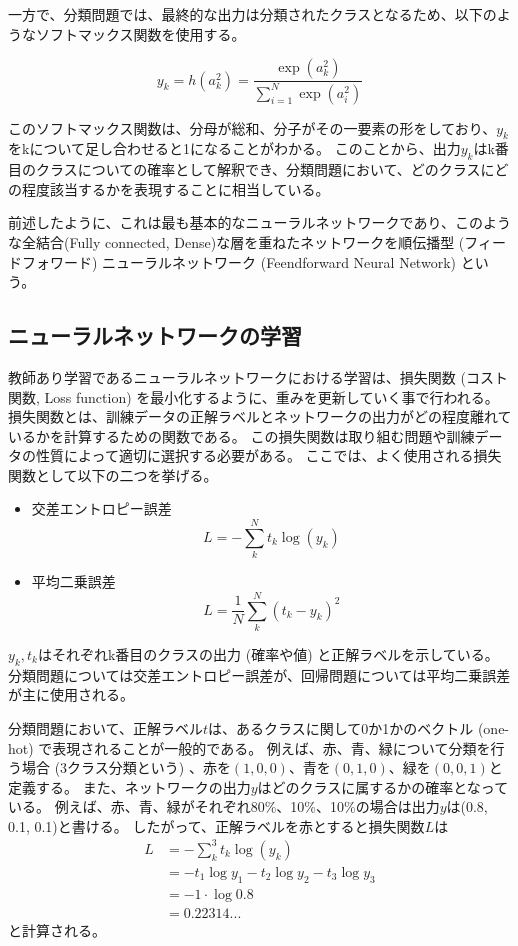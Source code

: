 一方で、分類問題では、最終的な出力は分類されたクラスとなるため、以下のようなソフトマックス関数を使用する。

\begin{equation}
 y_k = h(a^2_k) = \frac{\exp{(a^2_k)}}{\sum^N_{i=1}\exp{(a^2_i)}}
\end{equation}

このソフトマックス関数は、分母が総和、分子がその一要素の形をしており、$y_k$をkについて足し合わせると1になることがわかる。
このことから、出力$y_k$はk番目のクラスについての確率として解釈でき、分類問題において、どのクラスにどの程度該当するかを表現することに相当している。

前述したように、これは最も基本的なニューラルネットワークであり、このような全結合(Fully connected, Dense)な層を重ねたネットワークを順伝播型 (フィードフォワード) ニューラルネットワーク (Feendforward Neural Network) という。

\subsection{ニューラルネットワークの学習} \label{DL:NN:TrainingofNN}

教師あり学習であるニューラルネットワークにおける学習は、損失関数 (コスト関数, Loss function) を最小化するように、重みを更新していく事で行われる。
損失関数とは、訓練データの正解ラベルとネットワークの出力がどの程度離れているかを計算するための関数である。
この損失関数は取り組む問題や訓練データの性質によって適切に選択する必要がある。
ここでは、よく使用される損失関数として以下の二つを挙げる。
\begin{itemize}
  \item 交差エントロピー誤差
\begin{equation}
 L = - \sum^N_k t_k \log{(y_k)}
\end{equation}
  \item 平均二乗誤差
\begin{equation}
 L = \frac{1}{N} \sum^N_k(t_k - y_k)^2
\end{equation}
\end{itemize}
$y_k, t_k$はそれぞれk番目のクラスの出力 (確率や値) と正解ラベルを示している。
分類問題については交差エントロピー誤差が、回帰問題については平均二乗誤差が主に使用される。

分類問題において、正解ラベル$t$は、あるクラスに関して0か1かのベクトル (one-hot) で表現されることが一般的である。
例えば、赤、青、緑について分類を行う場合 (3クラス分類という) 、赤を$(1, 0, 0)$、青を$(0, 1, 0)$、緑を$(0, 0, 1)$と定義する。
また、ネットワークの出力$y$はどのクラスに属するかの確率となっている。
例えば、赤、青、緑がそれぞれ80\%、10\%、10\%の場合は出力$y$は(0.8, 0.1, 0.1)と書ける。
したがって、正解ラベルを赤とすると損失関数$L$は
\begin{equation}
 \begin{split}
  L &= - \sum^3_k t_k \log{(y_k)} \\
    &= - t_1 \log{y_1} - t_2 \log{y_2} - t_3 \log{y_3} \\
    &= - 1 \cdot \log{0.8}\\
    &= 0.22314...
 \end{split}
\end{equation}
と計算される。

